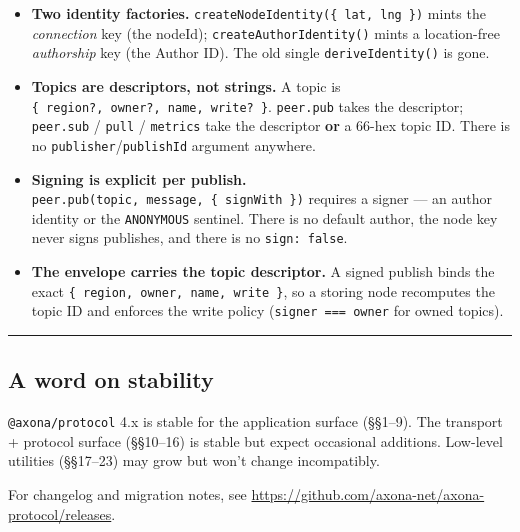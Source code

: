 \documentclass[
  nobib]{tufte-handout}
\providecommand{\tightlist}{%
  \setlength{\itemsep}{0pt}\setlength{\parskip}{0pt}}
\begin{document}
\begin{itemize}
\tightlist
\item
  \textbf{Two identity factories.}
  \texttt{createNodeIdentity(\{\ lat,\ lng\ \})} mints the
  \emph{connection} key (the nodeId); \texttt{createAuthorIdentity()}
  mints a location-free \emph{authorship} key (the Author ID). The old
  single \texttt{deriveIdentity()} is gone.
\item
  \textbf{Topics are descriptors, not strings.} A topic is
  \texttt{\{\ region?,\ owner?,\ name,\ write?\ \}}. \texttt{peer.pub}
  takes the descriptor; \texttt{peer.sub} / \texttt{pull} /
  \texttt{metrics} take the descriptor \textbf{or} a 66-hex topic ID.
  There is no \texttt{publisher}/\texttt{publishId} argument anywhere.
\item
  \textbf{Signing is explicit per publish.}
  \texttt{peer.pub(topic,\ message,\ \{\ signWith\ \})} requires a
  signer --- an author identity or the \texttt{ANONYMOUS} sentinel.
  There is no default author, the node key never signs publishes, and
  there is no \texttt{sign:\ false}.
\item
  \textbf{The envelope carries the topic descriptor.} A signed publish
  binds the exact \texttt{\{\ region,\ owner,\ name,\ write\ \}}, so a
  storing node recomputes the topic ID and enforces the write policy
  (\texttt{signer\ ===\ owner} for owned topics).
\end{itemize}

\begin{center}\rule{0.5\linewidth}{0.5pt}\end{center}

\subsection{A word on stability}\label{a-word-on-stability}

\texttt{@axona/protocol} 4.x is stable for the application surface
(§§1--9). The transport + protocol surface (§§10--16) is stable but
expect occasional additions. Low-level utilities (§§17--23) may grow but
won't change incompatibly.

For changelog and migration notes, see
\url{https://github.com/axona-net/axona-protocol/releases}.
\end{document}
